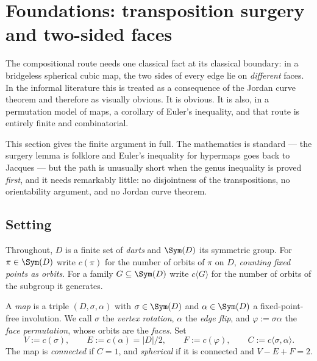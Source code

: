 %
%

\section{Foundations: transposition surgery and two-sided faces}
\label{sec:map-euler-foundations}

The compositional route needs one classical fact at its classical boundary:
in a bridgeless spherical cubic map, the two sides of every edge lie on
\emph{different} faces. In the informal literature this is treated as a
consequence of the Jordan curve theorem and therefore as visually obvious.
It is obvious. It is also, in a permutation model of maps, a corollary of
Euler's inequality, and that route is entirely finite and combinatorial.

This section gives the finite argument in full. The mathematics is
standard --- the surgery lemma is folklore and Euler's inequality for
hypermaps goes back to Jacques --- but the path is unusually short when the
genus inequality is proved \emph{first}, and it needs remarkably little: no
disjointness of the transpositions, no orientability argument, and no
Jordan curve theorem.

\subsection{Setting}

Throughout, $D$ is a finite set of \emph{darts} and $\Sym(D)$ its symmetric
group. For $\pi \in \Sym(D)$ write $c(\pi)$ for the number of orbits of
$\pi$ on $D$, \emph{counting fixed points as orbits}. For a family
$G \subseteq \Sym(D)$ write $c\langle G\rangle$ for the number of orbits of
the subgroup it generates.

\begin{definition}\label{def:map}
A \emph{map} is a triple $(D,\sigma,\alpha)$ with $\sigma \in \Sym(D)$ and
$\alpha \in \Sym(D)$ a fixed-point-free involution. We call $\sigma$ the
\emph{vertex rotation}, $\alpha$ the \emph{edge flip}, and
$\varphi := \sigma\alpha$ the \emph{face permutation}, whose orbits are the
\emph{faces}. Set
\[
  V := c(\sigma), \qquad E := c(\alpha) = |D|/2, \qquad
  F := c(\varphi), \qquad C := c\langle \sigma,\alpha\rangle .
\]
The map is \emph{connected} if $C = 1$, and \emph{spherical} if it is
connected and $V - E + F = 2$.
\end{definition}

